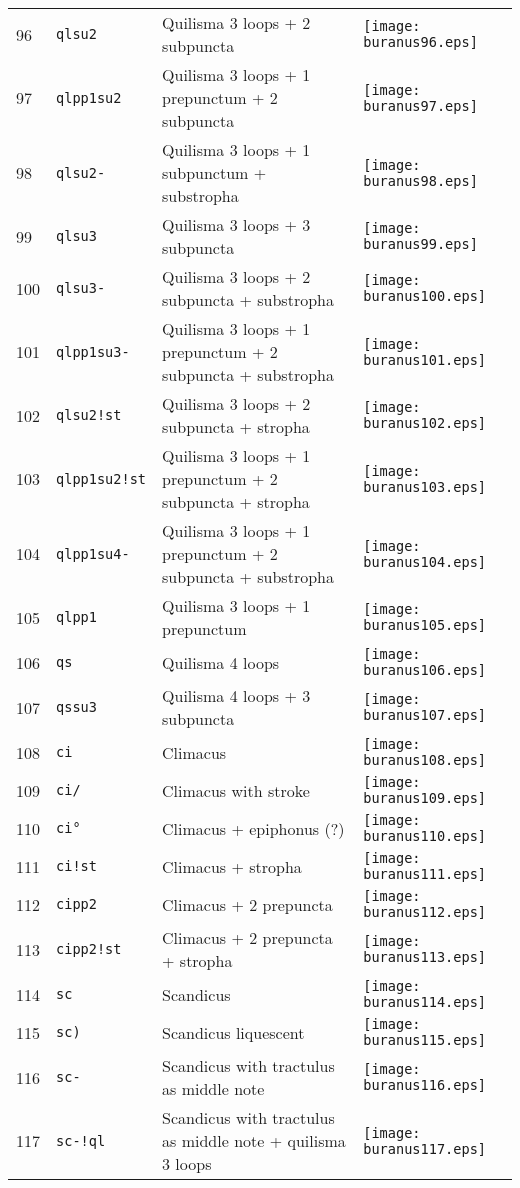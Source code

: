 \documentclass{scrarticle}
\begin{document}
\begin{longtable}{l|l|l|l}
96 & \texttt{qlsu2} & Quilisma 3 loops + 2 subpuncta & \texttt{[image: buranus96.eps]} \\
97 & \texttt{qlpp1su2} & Quilisma 3 loops + 1 prepunctum + 2 subpuncta & \texttt{[image: buranus97.eps]} \\
98 & \texttt{qlsu2-} & Quilisma 3 loops + 1 subpunctum + substropha & \texttt{[image: buranus98.eps]} \\
99 & \texttt{qlsu3} & Quilisma 3 loops + 3 subpuncta & \texttt{[image: buranus99.eps]} \\
100 & \texttt{qlsu3-} & Quilisma 3 loops + 2 subpuncta + substropha & \texttt{[image: buranus100.eps]} \\
101 & \texttt{qlpp1su3-} & Quilisma 3 loops + 1 prepunctum + 2 subpuncta + substropha & \texttt{[image: buranus101.eps]} \\
102 & \texttt{qlsu2!st} & Quilisma 3 loops + 2 subpuncta + stropha & \texttt{[image: buranus102.eps]} \\
103 & \texttt{qlpp1su2!st} & Quilisma 3 loops + 1 prepunctum + 2 subpuncta + stropha & \texttt{[image: buranus103.eps]} \\
104 & \texttt{qlpp1su4-} & Quilisma 3 loops + 1 prepunctum + 2 subpuncta + substropha & \texttt{[image: buranus104.eps]} \\
105 & \texttt{qlpp1} & Quilisma 3 loops + 1 prepunctum & \texttt{[image: buranus105.eps]} \\
106 & \texttt{qs} & Quilisma 4 loops & \texttt{[image: buranus106.eps]} \\
107 & \texttt{qssu3} & Quilisma 4 loops + 3 subpuncta & \texttt{[image: buranus107.eps]} \\
108 & \texttt{ci} & Climacus & \texttt{[image: buranus108.eps]} \\
109 & \texttt{ci/} & Climacus with stroke & \texttt{[image: buranus109.eps]} \\
110 & \texttt{ci°} & Climacus + epiphonus (?) & \texttt{[image: buranus110.eps]} \\
111 & \texttt{ci!st} & Climacus + stropha & \texttt{[image: buranus111.eps]} \\
112 & \texttt{cipp2} & Climacus + 2 prepuncta & \texttt{[image: buranus112.eps]} \\
113 & \texttt{cipp2!st} & Climacus + 2 prepuncta + stropha & \texttt{[image: buranus113.eps]} \\
114 & \texttt{sc} & Scandicus & \texttt{[image: buranus114.eps]} \\
115 & \texttt{sc)} & Scandicus liquescent & \texttt{[image: buranus115.eps]} \\
116 & \texttt{sc-} & Scandicus with tractulus as middle note & \texttt{[image: buranus116.eps]} \\
117 & \texttt{sc-!ql} & Scandicus with tractulus as middle note + quilisma 3 loops & \texttt{[image: buranus117.eps]} \\\end{longtable}
\end{document}

